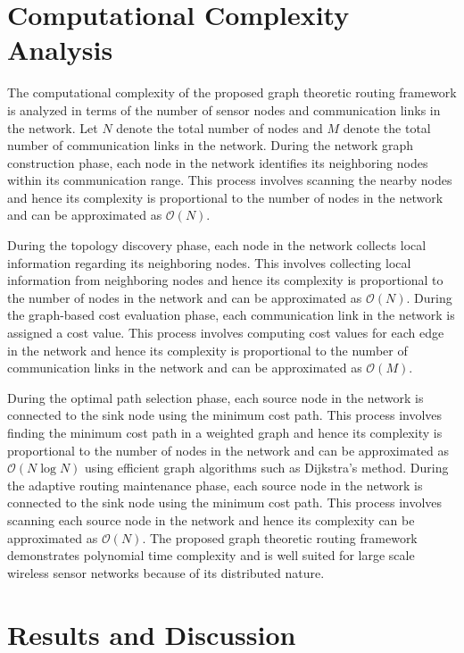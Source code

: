 \documentclass[a4paper,fleqn]{cas-dc}
\numberwithin{equation}{section}
\begin{document}
\section{Computational Complexity Analysis}

The computational complexity of the proposed graph theoretic routing framework is analyzed in terms of the number of sensor nodes and communication links in the network. Let $N$ denote the total number of nodes and $M$ denote the total number of communication links in the network. During the network graph construction phase, each node in the network identifies its neighboring nodes within its communication range. This process involves scanning the nearby nodes and hence its complexity is proportional to the number of nodes in the network and can be approximated as $\mathcal{O}(N)$.

During the topology discovery phase, each node in the network collects local information regarding its neighboring nodes. This involves collecting local information from neighboring nodes and hence its complexity is proportional to the number of nodes in the network and can be approximated as $\mathcal{O}(N)$. During the graph-based cost evaluation phase, each communication link in the network is assigned a cost value. This process involves computing cost values for each edge in the network and hence its complexity is proportional to the number of communication links in the network and can be approximated as $\mathcal{O}(M)$.

During the optimal path selection phase, each source node in the network is connected to the sink node using the minimum cost path. This process involves finding the minimum cost path in a weighted graph and hence its complexity is proportional to the number of nodes in the network and can be approximated as $\mathcal{O}(N\log N)$ using efficient graph algorithms such as Dijkstra's method. During the adaptive routing maintenance phase, each source node in the network is connected to the sink node using the minimum cost path. This process involves scanning each source node in the network and hence its complexity can be approximated as $\mathcal{O}(N)$. The proposed graph theoretic routing framework demonstrates polynomial time complexity and is well suited for large scale wireless sensor networks because of its distributed nature.

\section{Results and Discussion}
\label{sec:results}
\end{document}
